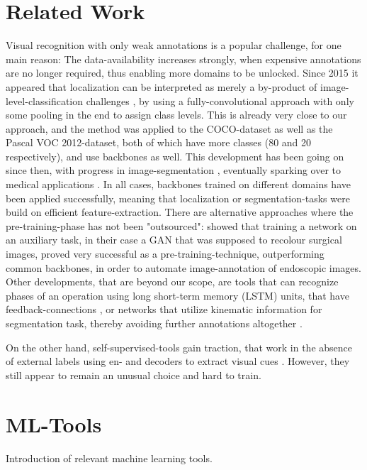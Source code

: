 \section{Related Work}
Visual recognition with only weak annotations is a popular challenge, for one main reason: The data-availability increases strongly, when expensive annotations are no longer required, thus enabling more domains to be unlocked. Since 2015 it appeared that localization can be interpreted as merely a by-product of image-level-classification challenges \citep{localization_free}, by using a fully-convolutional approach with only some pooling in the end to assign class levels. This is already very close to our approach, and the method was applied to the COCO-dataset as well as the Pascal VOC 2012-dataset, both of which have more classes (80 and 20 respectively), and use backbones as well. This development has been going on since then, with progress in image-segmentation \citep{classpeak}, eventually sparking over to medical applications \citep{Vardazaryan}.
In all cases, backbones trained on different domains have been applied successfully, meaning that localization or segmentation-tasks were build on efficient feature-extraction. There are alternative approaches where the pre-training-phase has not been "outsourced": \cite{ross2018exploiting} showed that training a network on an auxiliary task, in their case a GAN that was supposed to recolour surgical images, proved very successful as a pre-training-technique, outperforming common backbones, in order to automate image-annotation of endoscopic images.
Other developments, that are beyond our scope, are tools that can recognize phases of an operation using long short-term memory (LSTM) units, that have feedback-connections \cite{lstm}, or networks that utilize kinematic information for segmentation task, thereby avoiding further annotations altogether \cite{da2019self}.

On the other hand, self-supervised-tools gain traction, that work in the absence of external labels using en- and decoders to extract visual cues \cite{VAE_discussion}. However, they still appear to remain an unusual choice and hard to train.

\section{ML-Tools}
Introduction of relevant machine learning tools.

